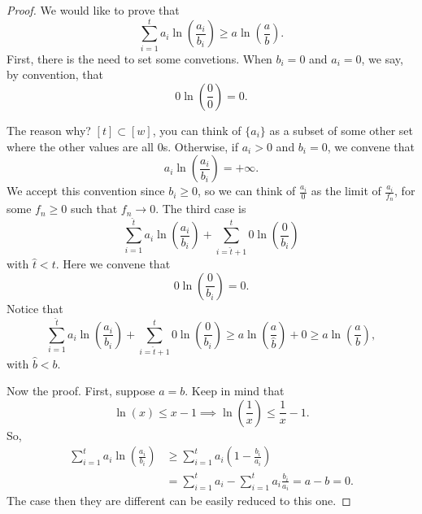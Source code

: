\begin{proof}
We would like to prove that
\begin{equation*}
	\sum_{i= 1}^t a_i \ln \left( \frac{a_i}{b_i} \right)
	\ge
	a \ln \left( \frac{a}{b} \right).
\end{equation*}
First, there is the need to set some convetions.
When $b_i = 0$ and $a_i = 0$, we say, by convention, that
\begin{equation*}
	0 \ln \left( \frac{0}{0} \right) = 0.
\end{equation*}
 
The reason why?
$[t] \subset [w]$, you can think of $\{a_i\}$ as a subset of some other set where the other values are all $0$s.
Otherwise, if $a_i > 0$ and $b_i = 0$, we convene that
\begin{equation*}
	a_i \ln \left( \frac{a_i}{b_i} \right) = +\infty.
\end{equation*}
We accept this convention since $b_i \geq 0$, so we can think of $\frac{a_i}{0}$ as the limit of $\frac{a_i}{f_n}$, for some $f_n \ge 0$ such that $f_n \to 0$.
The third case is
\begin{equation*}
  \sum_{i = 1}^{\hat{t}} a_i \ln \left( \frac{a_i}{b_i} \right)
  +
  \sum_{i = \hat{t} + 1}^{t} 0 \ln \left( \frac{0}{b_i} \right)
\end{equation*}
with $\hat{t} < t$.
Here we convene that
\begin{equation*}
	0 \ln \left( \frac{0}{b_i} \right) = 0.
\end{equation*}
Notice that 
\begin{equation*}
	\sum_{i = 1}^{\hat{t}} a_i \ln \left( \frac{a_i}{b_i} \right)
	+
	\sum_{i = \hat{t} + 1}^{t} 0 \ln \left( \frac{0}{b_i} \right)
	\ge a \ln \left( \frac{a}{\hat{b}} \right) + 0
	\ge a \ln \left( \frac{a}{b} \right),
\end{equation*}
with $\hat{b} < b$.

Now the proof.
First, suppose $a=b$.
Keep in mind that
\begin{equation*}
	\ln(x) \le x - 1
	\implies
	\ln \left( \frac{1}{x} \right) \le \frac{1}{x} - 1.
\end{equation*}
So,
\begin{align*}
	\sum_{i = 1}^{t} a_i \ln \left( \frac{a_i}{b_i} \right)
	& \ge
	\sum_{i = 1}^{t} a_i \left( 1 - \frac{b_i}{a_i} \right)
	\tag{w. eq. iff $a=b$}
	\\
	& =
	\sum_{i = 1}^{t} a_i - \sum_{i = 1}^{t} a_i \frac{b_i}{a_i}
	=
	a - b = 0.
\end{align*}
The case then they are different can be easily reduced to this one.


\end{proof}
